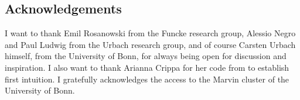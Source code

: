 \begin{strip}
\section{Acknowledgements}
I want to thank Emil Rosanowski from the Funcke research group, Alessio Negro and Paul Ludwig from the Urbach research group, and of course Carsten Urbach himself, from the University of Bonn, for always being open for discussion and inspiration. I also want to thank Arianna Crippa for her code from \cite{crippa2024} to establish first intuition. 
I gratefully acknowledges the access to the Marvin cluster of the University of Bonn.
\end{strip}
